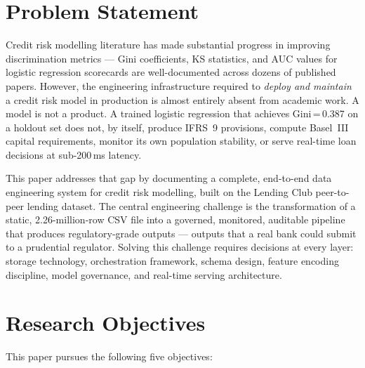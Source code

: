 \documentclass[12pt,a4paper]{report}
\begin{document}
\section{Problem Statement}

Credit risk modelling literature has made substantial progress in improving discrimination metrics --- Gini coefficients, KS statistics, and AUC values for logistic regression scorecards are well-documented across dozens of published papers. However, the engineering infrastructure required to \emph{deploy and maintain} a credit risk model in production is almost entirely absent from academic work. A model is not a product. A trained logistic regression that achieves Gini\,=\,0.387 on a holdout set does not, by itself, produce IFRS~9 provisions, compute Basel~III capital requirements, monitor its own population stability, or serve real-time loan decisions at sub-200\,ms latency.

This paper addresses that gap by documenting a complete, end-to-end data engineering system for credit risk modelling, built on the Lending Club peer-to-peer lending dataset. The central engineering challenge is the transformation of a static, 2.26-million-row CSV file into a governed, monitored, auditable pipeline that produces regulatory-grade outputs --- outputs that a real bank could submit to a prudential regulator. Solving this challenge requires decisions at every layer: storage technology, orchestration framework, schema design, feature encoding discipline, model governance, and real-time serving architecture.

\section{Research Objectives}

This paper pursues the following five objectives:
\end{document}
